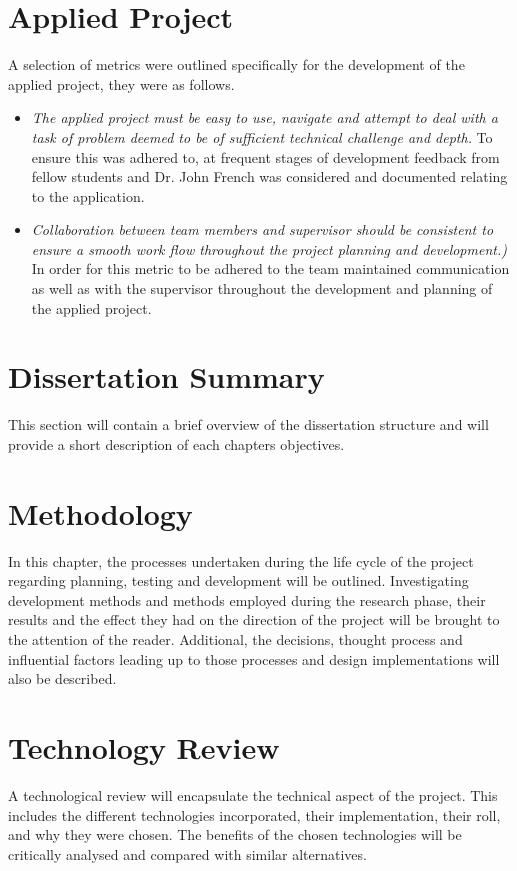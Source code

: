 \section{Applied Project}
A selection of metrics were outlined specifically for the development of the applied project, they were as follows.

\begin{itemize}

    \item \emph{The applied project must be easy to use, navigate and attempt to deal with a task of problem deemed to be of sufficient technical challenge and depth.} To ensure this was adhered to, at frequent stages of development feedback from fellow students and Dr. John French was considered and documented relating to the application.

    \item \emph{Collaboration between team members and supervisor should be consistent to ensure a smooth work flow throughout the project planning and development.)} In order for this metric to be adhered to the team maintained communication as well as with the supervisor throughout the development and planning of the applied project.
    
\end{itemize}

\section{Dissertation Summary}
This section will contain a brief overview of the dissertation structure and will provide a short description of each chapters objectives.

\section{Methodology}
In this chapter, the processes undertaken during the life cycle of the project regarding planning, testing and development will be outlined. Investigating development methods and methods employed during the research phase, their results and the effect they had on the direction of the project will be brought to the attention of the reader. Additional, the decisions, thought process and influential factors leading up to those processes and design implementations will also be described.

\section{Technology Review}
A technological review will encapsulate the technical aspect of the project. This includes the different technologies incorporated, their implementation, their roll, and why they were chosen. The benefits of the chosen technologies will be critically analysed and compared with similar alternatives. 

